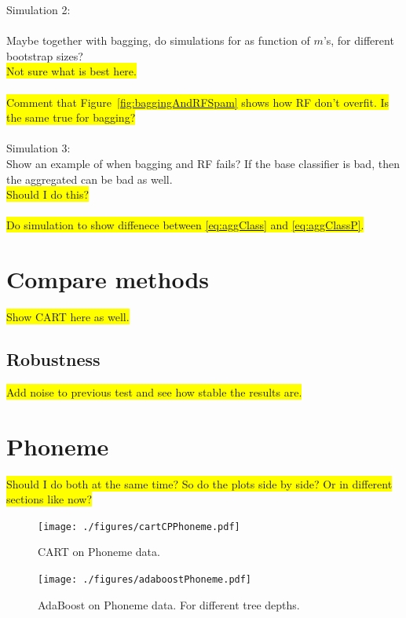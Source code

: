 Simulation 2: \\
\\
Maybe together with bagging, do simulations for as function of $m$'s, for different bootstrap sizes? \\
\colorbox{yellow}{Not sure what is best here.}\\
\\
\colorbox{yellow}{Comment that Figure~\ref{fig:baggingAndRFSpam} shows how RF don't overfit. Is the same true for bagging?}\\
\\
Simulation 3: \\
Show an example of when bagging and RF fails? If the base classifier is bad, then the aggregated can be bad as well.\\
\colorbox{yellow}{Should I do this?}\\
\\
\colorbox{yellow}{Do simulation to show diffenece between \eqref{eq:aggClass} and \eqref{eq:aggClassP}.}








\section{Compare methods}
\label{sec:Compare methods}
\colorbox{yellow}{Show CART here as well.}

\subsection{Robustness}
\label{sub:Robustness}

\colorbox{yellow}{Add noise to previous test and see how stable the results are.}
\section{Phoneme}
\label{sec:Phoneme}
\colorbox{yellow}{Should I do both at the same time? So do the plots side by side? Or in different sections like now?}
\begin{figure}[h!]
\begin{center}
    \texttt{[image: ./figures/cartCPPhoneme.pdf]}
\end{center}
\caption{CART on Phoneme data.}
\label{fig:cartCPPhoneme}
\end{figure}


\begin{figure}[h!]
\begin{center}
    \texttt{[image: ./figures/adaboostPhoneme.pdf]}
\end{center}
\caption{AdaBoost on Phoneme data. For different tree depths.}
\label{fig:adaboostPhoneme}
\end{figure}


